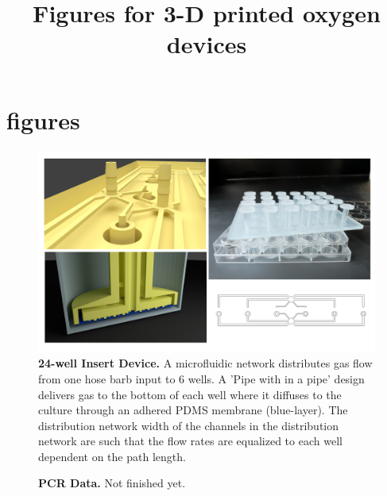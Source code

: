 \documentclass[]{article}
\title{Figures for  3-D printed oxygen devices}
\author{}
\begin{document}

\section{figures}

\begin{figure}[H]
\includegraphics[scale=0.2]{fig1.png} 
\caption{
{\bf 24-well Insert Device.} A microfluidic network distributes gas flow from one hose barb input to 6 wells.
A 'Pipe with in a pipe' design delivers gas to the bottom of each well where it diffuses to the culture through an adhered PDMS membrane (blue-layer).  
The distribution network width of the channels in the distribution network are such that the flow rates are equalized to each well dependent on the path length.
}
\label{figure1}
\end{figure}


\begin{figure}[H]
\caption{
{\bf PCR Data.}  Not finished yet.  
}
\label{pcr-data}
\end{figure}



\end{document}
